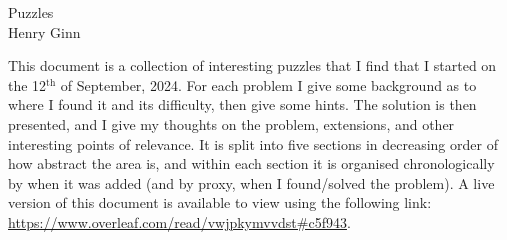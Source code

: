 \documentclass[hidelinks, 11 pt]{article}
\begin{document}
\newpage
\setcounter{page}{1}
\addtolength{\topmargin}{-1.6pt}
\thispagestyle{firstpage}

\begin{center}
    \vspace*{-20mm}
    \Huge Puzzles  \\
    \vspace{5mm}
    \large Henry Ginn  \\
\end{center}
\vspace{5mm}

This document is a collection of interesting puzzles that I find that I started on the 12$^\text{th}$ of September, 2024. For each problem I give some background as to where I found it and its difficulty, then give some hints. The solution is then presented, and I give my thoughts on the problem, extensions, and other interesting points of relevance. It is split into five sections in decreasing order of how abstract the area is, and within each section it is organised chronologically by when it was added (and by proxy, when I found/solved the problem). A live version of this document is available to view using the following link: \url{https://www.overleaf.com/read/vwjpkymvvdst#c5f943}.

\tableofcontents

\renewcommand{\contentsname}{}

\newpage

\newpage
\newpage
\newpage
\newpage
\newpage

\newpage


\fancyhf{}
\fancyhead[R]{}
\fancyfoot[C]{\thepage}



\end{document}
